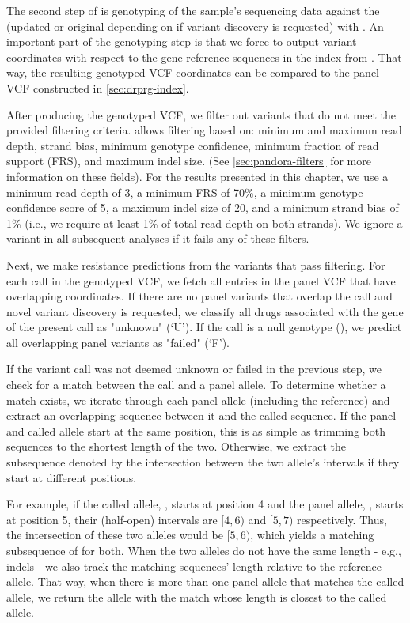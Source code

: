 The second step of  is genotyping of the sample's sequencing data against the \panrg{} (updated or original depending on if variant discovery is requested) with \pandora{} . An important part of the genotyping step is that we force \pandora{} to output variant coordinates with respect to the gene reference sequences in the index from . That way, the resulting genotyped VCF coordinates can be compared to the panel VCF constructed in \autoref{sec:drprg-index}. 

After producing the \pandora{} genotyped VCF, we filter out variants that do not meet the provided filtering criteria. \drprg{}  allows filtering based on: minimum and maximum read depth, strand bias, minimum genotype confidence, minimum fraction of read support (FRS), and maximum indel size. (See \autoref{sec:pandora-filters} for more information on these fields). For the results presented in this chapter, we use a minimum read depth of 3, a minimum FRS of 70\%, a minimum genotype confidence score of 5, a maximum indel size of 20, and a minimum strand bias of 1\% (i.e., we require at least 1\% of total read depth on both strands). We ignore a variant in all subsequent analyses if it fails any of these filters.

Next, we make resistance predictions from the variants that pass filtering. For each call in the genotyped VCF, we fetch all entries in the panel VCF that have overlapping coordinates. If there are no panel variants that overlap the call and novel variant discovery is requested, we classify all drugs associated with the gene of the present call as "unknown" (`U'). If the call is a null genotype (), we predict all overlapping panel variants as "failed" (`F').

If the variant call was not deemed unknown or failed in the previous step, we check for a match between the call and a panel allele. To determine whether a match exists, we iterate through each panel allele (including the reference) and extract an overlapping sequence between it and the called sequence. If the panel and called allele start at the same position, this is as simple as trimming both sequences to the shortest length of the two. Otherwise, we extract the subsequence denoted by the intersection between the two allele's intervals if they start at different positions. 

For example, if the called allele, , starts at position 4 and the panel allele, , starts at position 5, their (half-open) intervals are $[4,6)$ and $[5,7)$ respectively. Thus, the intersection of these two alleles would be $[5,6)$, which yields a matching subsequence of  for both. When the two alleles do not have the same length - e.g., indels - we also track the matching sequences' length relative to the reference allele. That way, when there is more than one panel allele that matches the called allele, we return the allele with the match whose length is closest to the called allele.

